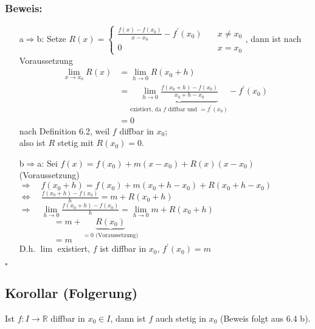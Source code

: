 \documentclass[12pt, titlepage]{article}
\newcommand{\R}{\mathds{R}}
\renewcommand{\>}{\rightarrow}
\renewcommand{\*}{\cdot}
\begin{document}
	\subsubsection*{Beweis:}
	\begin{itemize}
		\item[a$\Rightarrow$b:] Setze $R(x)=\begin{cases}
		\frac{f(x)-f(x_0)}{x-x_0}-f^\prime(x_0)&\quad x\neq x_0\\
		0&\quad x=x_0
		\end{cases}$, dann ist nach Voraussetzung \begin{align*}
			\lim\limits_{x\>x_0}R(x)&=\lim\limits_{h\>0}R(x_0+h)\\
			&=\underbrace{\lim\limits_{h\>0}\frac{f(x_0+h)-f(x_0)}{x_0+h-x_0}}_{\textrm{existiert, da }f\textrm{ diffbar und }=f^\prime(x_0)}-f^\prime(x_0)\\
			&=0
		\end{align*} nach Definition 6.2, weil $f$ diffbar in $x_0$;\\
		also ist $R$ stetig mit $R(x_0)=0$.
		\item[b$\Rightarrow$a:] Sei $f(x)=f(x_0)+m(x-x_0)+R(x)(x-x_0)$ (Voraussetzung)\\
		$\Rightarrow\quad f(x_0+h)=f(x_0)+m(x_0+h-x_0)+R(x_0+h-x_0)$\\
		$\Leftrightarrow\quad \frac{f(x_0+h)-f(x_0)}{h}=m+R(x_0+h)$\\
		$\Rightarrow\quad \lim\limits_{h\>0}\frac{f(x_0+h)-f(x_0)}{h}=\lim\limits_{h\>0}m+R(x_0+h)$\\
		$\qquad\qquad=m+\underbrace{R(x_0)}_{=0\textrm{ (Voraussetzung)}}$\\
		$\qquad\qquad=m$\\
		D.h. $\lim$ existiert, $f$ ist diffbar in $x_0$, $f^\prime(x_0)=m$
	\end{itemize}
	\hfill$\square$
	\subsection{Korollar (Folgerung)}
	Ist $f\colon I\>\R$ diffbar in $x_0\in I$, dann ist $f$ auch stetig in $x_0$ (Beweis folgt aus 6.4 b).
\end{document}
